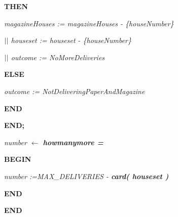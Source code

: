 \documentclass[11pt]{article}
\begin{document}
\begin{sloppypar}
\hspace*{0.80in}\bf THEN

\hspace*{1.00in}\it magazineHouses \rm := \it magazineHouses \rm - \rm \{\it houseNumber\rm \}

\hspace*{1.00in} $\mbox{$\mid\mid$}$  \it houseset \rm := \it houseset \rm - \rm \{\it houseNumber\rm \}

\hspace*{1.00in} $\mbox{$\mid\mid$}$  \it outcome \rm := \it NoMoreDeliveries

\hspace*{0.80in}\bf ELSE

\hspace*{1.00in}\it outcome \rm := \it NotDeliveringPaperAndMagazine

\hspace*{0.80in}\bf END

\hspace*{0.60in}\bf END\rm ;

\hspace*{0.60in}

\hspace*{0.40in}\it number  $\leftarrow$  \bf howmanymore \rm =

\hspace*{0.60in}\bf BEGIN

\hspace*{0.80in}\it number \rm :=\hspace*{0.15in}\it MAX\_DELIVERIES \rm - \bf card\rm ( \it houseset \rm ) 

\hspace*{0.60in}\bf END

\vspace*{4mm}
\bf END

\newpage
\end{sloppypar}
\end{document}
